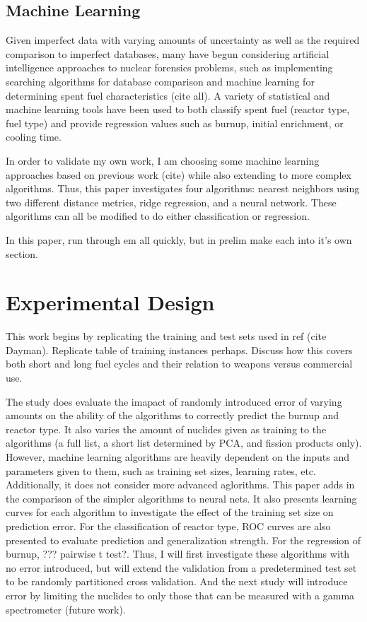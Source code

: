 \documentclass{anstrans}
\begin{document}
\subsection{Machine Learning}

Given imperfect data with varying amounts of uncertainty as well as the
required comparison to imperfect databases, many have begun considering
artificial intelligence approaches to nuclear forensics problems, such as
implementing searching algorithms for database comparison and machine learning
for determining spent fuel characteristics (cite all). A variety of statistical
and machine learning tools have been used to both classify spent fuel (reactor
type, fuel type) and provide regression values such as burnup, initial
enrichment, or cooling time.

In order to validate my own work, I am choosing some machine learning
approaches based on previous work (cite) while also extending to more complex
algorithms. Thus, this paper investigates four algorithms: nearest neighbors
using two different distance metrics, ridge regression, and a neural network.
These algorithms can all be modified to do either classification or regression. 

In this paper, run through em all quickly, but in prelim make each into it's
own section.

\section{Experimental Design}

This work begins by replicating the training and test sets used in ref (cite
Dayman). Replicate table of training instances perhaps. Discuss how this covers
both short and long fuel cycles and their relation to weapons versus commercial
use. 

The study does evaluate the imapact of randomly introduced error of
varying amounts on the ability of the algorithms to correctly predict the
burnup and reactor type. It also varies the amount of nuclides given as
training to the algorithms (a full list, a short list determined by PCA, and
fission products only). However, machine learning algorithms are heavily
dependent on the inputs and parameters given to them, such as training set
sizes, learning rates, etc. Additionally, it does not consider more advanced
aglorithms. This paper adds in the comparison of the simpler algorithms to
neural nets. It also presents learning curves for each algorithm to investigate
the effect of the training set size on prediction error. For the classification
of reactor type, ROC curves are also presented to evaluate prediction and
generalization strength. For the regression of burnup, ??? pairwise t test?.
Thus, I will first investigate these algorithms with no error introduced, but
will extend the validation from a predetermined test set to be randomly
partitioned cross validation.  And the next study will introduce error by
limiting the nuclides to only those that can be measured with a gamma
spectrometer (future work).
\end{document}
